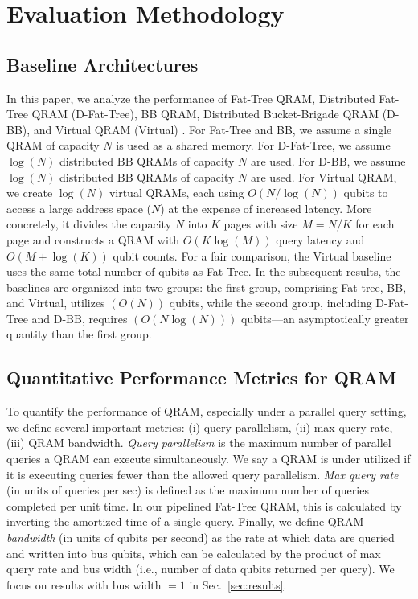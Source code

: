 \section{Evaluation Methodology}
\label{sec:eval}

\subsection{Baseline Architectures}

In this paper, we analyze the performance of Fat-Tree QRAM, Distributed Fat-Tree QRAM (D-Fat-Tree), BB QRAM\cite{giovannetti2008architectures}, Distributed Bucket-Brigade QRAM (D-BB), and Virtual QRAM (Virtual) \cite{xu2023systems}. For Fat-Tree and BB, we assume a single QRAM of capacity $N$ is used as a shared memory.  For D-Fat-Tree, we assume $\log(N)$ distributed BB QRAMs of capacity $N$ are used. For D-BB, we assume $\log(N)$ distributed BB QRAMs of capacity $N$ are used. For Virtual QRAM, we create $\log(N)$ virtual QRAMs, each using $O(N/\log(N))$ qubits to access a large address space ($N$) at the expense of increased latency. More concretely, it divides the capacity $N$ into $K$ pages with size $M=N/K$ for each page and constructs a QRAM with $O(K\log{(M)})$ query latency and $O(M+\log{(K)})$ qubit counts. For a fair comparison, the Virtual baseline uses the same total number of qubits as Fat-Tree. In the subsequent results, the baselines are organized into two groups: the first group, comprising Fat-tree, BB, and Virtual, utilizes $(O(N))$ qubits, while the second group, including D-Fat-Tree and D-BB, requires $(O(N\log(N)))$ qubits—an asymptotically greater quantity than the first group.

\subsection{Quantitative Performance Metrics for QRAM}
To quantify the performance of QRAM, especially under a parallel query setting, we define several important metrics: (i) query parallelism, (ii) max query rate, (iii) QRAM bandwidth. \emph{Query parallelism} is the maximum number of parallel queries a QRAM can execute simultaneously. We say a QRAM is under utilized if it is executing queries fewer than the allowed query parallelism. \emph{Max query rate} (in units of queries per sec) is defined as the maximum number of queries completed per unit time. In our pipelined Fat-Tree QRAM, this is calculated by inverting the amortized time of a single query. Finally, we define QRAM \emph{bandwidth} (in units of qubits per second) as the rate at which data are queried and written into bus qubits, which can be calculated by the product of max query rate and bus width (i.e., number of data qubits returned per query). We focus on results with bus width $= 1$ in Sec.~\ref{sec:results}.

